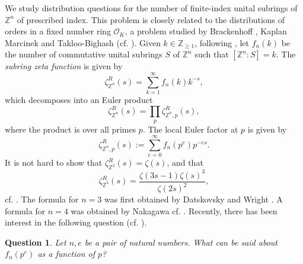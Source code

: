 \documentclass[a4paper]{amsart}
\newtheorem{question}[theorem]{Question}
\numberwithin{equation}{section}
\theoremstyle{remark}
\newcommand{\Z}{\mathbb{Z}}
\newcommand{\cO}{\mathcal{O}}
\begin{document}
\par We study distribution questions for the number of finite-index unital subrings of $\Z^n$ of prescribed index. This problem is closely related to the distributions of orders in a fixed number ring $\cO_K$, a problem studied by Brackenhoff \cite{brakenhoff2009counting}, Kaplan Marcinek and Takloo-Bighash (cf. \cite{kaplan2015distribution}). Given $k\in \Z_{\geq 1}$, following \cite{liu2007counting}, let $f_n(k)$ be the number of commutative unital subrings $S$ of $\Z^n$ such that $[\Z^n:S]=k$. The \emph{subring zeta function} is given by 
\[\zeta_{\Z^n}^R(s)=\sum_{k=1}^\infty f_n(k) k^{-s}, \]
which decomposes into an Euler product 
\[\zeta_{\Z^n}^R(s)=\prod_p \zeta_{\Z^n,p}^R(s), \] where the product is over all primes $p$. The local Euler factor at $p$ is given by 
\[\zeta_{\Z^n,p}^R(s):=\sum_{e=0}^\infty f_n(p^e) p^{-es}.\]
It is not hard to show that $\zeta_{\Z^2}^R(s)=\zeta(s)$, and that
\[\zeta_{\Z^3}^R(s)=\frac{\zeta(3s-1)\zeta(s)^3}{\zeta(2s)^2},\]
cf. \cite[Proposition 4.1]{liu2007counting}. The formula for $n=3$ was first obtained by Datskovsky and Wright \cite{datskovsky1988density}. A formula for $n=4$ was obtained by Nakagawa cf. \cite{nakagawa1996orders}. Recently, there has been interest in the following question (cf. \cite[Question 1.2]{ishamlowerbound}).
\begin{question}
Let $n, e$ be a pair of natural numbers. What can be said about $f_n(p^e)$ as a function of $p$?
\end{question}
\end{document}
